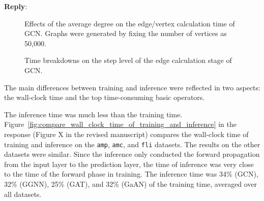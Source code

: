 \documentclass[12pt]{article}
\newenvironment{reply}
   {\medskip \noindent \textbf{Reply}:\  }
   {\medskip}
\begin{document}
\begin{reply}
\begin{figure}[H]
                \caption{Effects of the average degree on the edge/vertex calculation time of GCN. Graphs were generated by fixing the number of vertices as 50,000.}
                \label{fig:compare_effect_of_degree}
    \end{figure}
    \begin{figure}[H]
                \caption{Time breakdowns on the step level of the edge calculation stage of GCN.}
                \label{fig:compare_time_breakdown_of_edge_calculation}
    \end{figure}
    
    The main differences between training and inference were reflected in two aspects: the wall-clock time and the top time-consuming basic operators.
    
    The inference time was much less than the training time.
    Figure~\ref{fig:compare_wall_clock_time_of_training_and_inference} in the response (Figure X in the revised manuscript) compares the wall-clock time of training and inference on the \texttt{amp}, \texttt{amc}, and \texttt{fli} datasets.
    The results on the other datasets were similar.
    Since the inference only conducted the forward propagation from the input layer to the prediction layer, the time of inference was very close to the time of the forward phase in training.
    The inference time was 34\% (GCN), 32\% (GGNN), 25\% (GAT), and 32\% (GaAN) of the training time, averaged over all datasets.
    

\end{reply}
\end{document}
